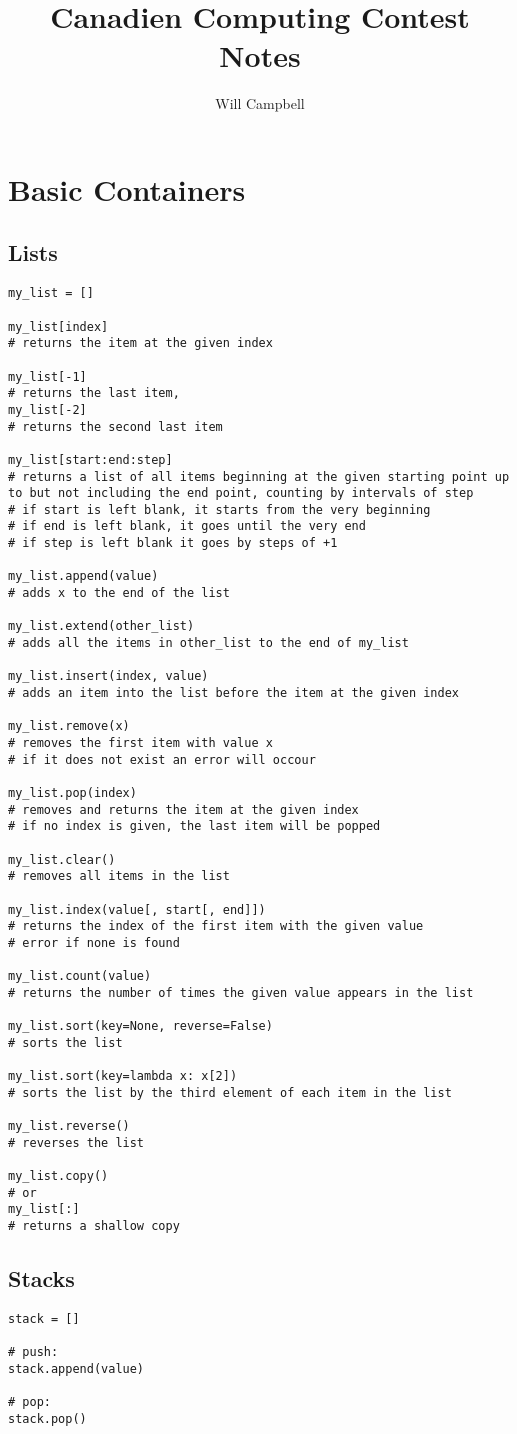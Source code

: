 \documentclass[12pt]{article}
\title{Canadien Computing Contest Notes}
\author{Will Campbell}
\begin{document}
\section{Basic Containers}
\subsection{Lists}
\begin{lstlisting}
my_list = []

my_list[index]
# returns the item at the given index

my_list[-1]
# returns the last item,
my_list[-2]
# returns the second last item

my_list[start:end:step]
# returns a list of all items beginning at the given starting point up to but not including the end point, counting by intervals of step
# if start is left blank, it starts from the very beginning
# if end is left blank, it goes until the very end
# if step is left blank it goes by steps of +1

my_list.append(value)
# adds x to the end of the list

my_list.extend(other_list)
# adds all the items in other_list to the end of my_list

my_list.insert(index, value)
# adds an item into the list before the item at the given index

my_list.remove(x)
# removes the first item with value x
# if it does not exist an error will occour

my_list.pop(index)
# removes and returns the item at the given index
# if no index is given, the last item will be popped

my_list.clear()
# removes all items in the list

my_list.index(value[, start[, end]])
# returns the index of the first item with the given value
# error if none is found

my_list.count(value)
# returns the number of times the given value appears in the list

my_list.sort(key=None, reverse=False)
# sorts the list

my_list.sort(key=lambda x: x[2])
# sorts the list by the third element of each item in the list

my_list.reverse()
# reverses the list

my_list.copy()
# or
my_list[:]
# returns a shallow copy
\end{lstlisting}

\subsection{Stacks}
\begin{lstlisting}
stack = []

# push:
stack.append(value)

# pop:
stack.pop()
\end{lstlisting}
\end{document}
